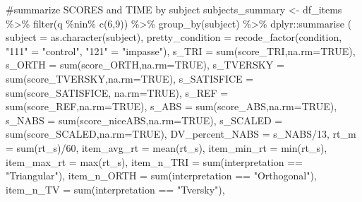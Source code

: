 \documentclass[
  letterpaper,
  DIV=11,
  numbers=noendperiod]{scrreprt}
\newenvironment{Shaded}{\begin{snugshade}}{\end{snugshade}}
\newcommand{\AttributeTok}[1]{\textcolor[rgb]{0.40,0.45,0.13}{#1}}
\newcommand{\CommentTok}[1]{\textcolor[rgb]{0.37,0.37,0.37}{#1}}
\newcommand{\ConstantTok}[1]{\textcolor[rgb]{0.56,0.35,0.01}{#1}}
\newcommand{\DecValTok}[1]{\textcolor[rgb]{0.68,0.00,0.00}{#1}}
\newcommand{\FunctionTok}[1]{\textcolor[rgb]{0.28,0.35,0.67}{#1}}
\newcommand{\NormalTok}[1]{\textcolor[rgb]{0.00,0.23,0.31}{#1}}
\newcommand{\OtherTok}[1]{\textcolor[rgb]{0.00,0.23,0.31}{#1}}
\newcommand{\SpecialCharTok}[1]{\textcolor[rgb]{0.37,0.37,0.37}{#1}}
\newcommand{\StringTok}[1]{\textcolor[rgb]{0.13,0.47,0.30}{#1}}
\begin{document}
\begin{Shaded}
\begin{Highlighting}[]
\CommentTok{\#summarize SCORES and TIME by subject}
\NormalTok{subjects\_summary }\OtherTok{\textless{}{-}}\NormalTok{ df\_items }\SpecialCharTok{\%\textgreater{}\%} \FunctionTok{filter}\NormalTok{(q }\SpecialCharTok{\%nin\%} \FunctionTok{c}\NormalTok{(}\DecValTok{6}\NormalTok{,}\DecValTok{9}\NormalTok{)) }\SpecialCharTok{\%\textgreater{}\%} \FunctionTok{group\_by}\NormalTok{(subject) }\SpecialCharTok{\%\textgreater{}\%}\NormalTok{ dplyr}\SpecialCharTok{::}\FunctionTok{summarise}\NormalTok{ (}
  \AttributeTok{subject =} \FunctionTok{as.character}\NormalTok{(subject),}
  \AttributeTok{pretty\_condition =} \FunctionTok{recode\_factor}\NormalTok{(condition, }\StringTok{"111"} \OtherTok{=} \StringTok{"control"}\NormalTok{, }\StringTok{"121"} \OtherTok{=}  \StringTok{"impasse"}\NormalTok{),}
  \AttributeTok{s\_TRI =} \FunctionTok{sum}\NormalTok{(score\_TRI,}\AttributeTok{na.rm=}\ConstantTok{TRUE}\NormalTok{),}
  \AttributeTok{s\_ORTH =} \FunctionTok{sum}\NormalTok{(score\_ORTH,}\AttributeTok{na.rm=}\ConstantTok{TRUE}\NormalTok{),}
  \AttributeTok{s\_TVERSKY =} \FunctionTok{sum}\NormalTok{(score\_TVERSKY,}\AttributeTok{na.rm=}\ConstantTok{TRUE}\NormalTok{),}
  \AttributeTok{s\_SATISFICE =} \FunctionTok{sum}\NormalTok{(score\_SATISFICE, }\AttributeTok{na.rm=}\ConstantTok{TRUE}\NormalTok{),}
  \AttributeTok{s\_REF =} \FunctionTok{sum}\NormalTok{(score\_REF,}\AttributeTok{na.rm=}\ConstantTok{TRUE}\NormalTok{),}
  \AttributeTok{s\_ABS =} \FunctionTok{sum}\NormalTok{(score\_ABS,}\AttributeTok{na.rm=}\ConstantTok{TRUE}\NormalTok{),}
  \AttributeTok{s\_NABS =} \FunctionTok{sum}\NormalTok{(score\_niceABS,}\AttributeTok{na.rm=}\ConstantTok{TRUE}\NormalTok{),}
  \AttributeTok{s\_SCALED =} \FunctionTok{sum}\NormalTok{(score\_SCALED,}\AttributeTok{na.rm=}\ConstantTok{TRUE}\NormalTok{),}
  \AttributeTok{DV\_percent\_NABS =}\NormalTok{ s\_NABS}\SpecialCharTok{/}\DecValTok{13}\NormalTok{,}
  \AttributeTok{rt\_m =} \FunctionTok{sum}\NormalTok{(rt\_s)}\SpecialCharTok{/}\DecValTok{60}\NormalTok{,}
  \AttributeTok{item\_avg\_rt =} \FunctionTok{mean}\NormalTok{(rt\_s),}
  \AttributeTok{item\_min\_rt =} \FunctionTok{min}\NormalTok{(rt\_s),}
  \AttributeTok{item\_max\_rt =} \FunctionTok{max}\NormalTok{(rt\_s),}
  \AttributeTok{item\_n\_TRI =} \FunctionTok{sum}\NormalTok{(interpretation }\SpecialCharTok{==} \StringTok{"Triangular"}\NormalTok{),}
  \AttributeTok{item\_n\_ORTH =} \FunctionTok{sum}\NormalTok{(interpretation }\SpecialCharTok{==} \StringTok{"Orthogonal"}\NormalTok{),}
  \AttributeTok{item\_n\_TV =} \FunctionTok{sum}\NormalTok{(interpretation }\SpecialCharTok{==} \StringTok{"Tversky"}\NormalTok{),}

\end{Highlighting}
\end{Shaded}
\end{document}
